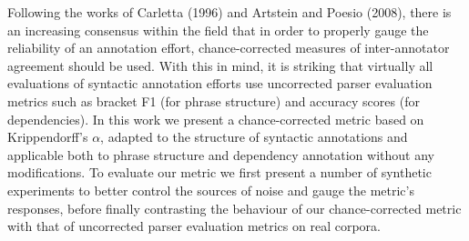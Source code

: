 Following the works of Carletta (1996) and Artstein and Poesio (2008), there is an increasing consensus within the field that in order to properly gauge the reliability of an annotation effort, chance-corrected measures of inter-annotator agreement should be used. With this in mind, it is striking that virtually all evaluations of syntactic annotation efforts use uncorrected parser evaluation metrics such as bracket F1 (for phrase structure) and accuracy scores (for dependencies). In this work we present a chance-corrected metric based on Krippendorff's $\alpha$, adapted to the structure of syntactic annotations and applicable both to phrase structure and dependency annotation without any modifications. To evaluate our metric we first present a number of synthetic experiments to better control the sources of noise and gauge the metric's responses, before finally contrasting the behaviour of our chance-corrected metric with that of uncorrected parser evaluation metrics on real corpora.
